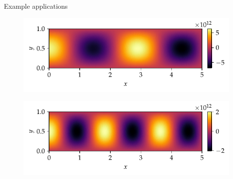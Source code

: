 \documentclass{beamer}
\begin{document}
\begin{frame}{Example applications}

    \begin{figure}
        \includegraphics[scale=0.9]{../report/plots/rectangular_cavity_mode1.pdf}
    \end{figure}
    \vspace{-30pt}
    \begin{figure}
        \includegraphics[scale=0.9]{../report/plots/rectangular_cavity_mode5.pdf}
    \end{figure}

\end{frame}
\end{document}
